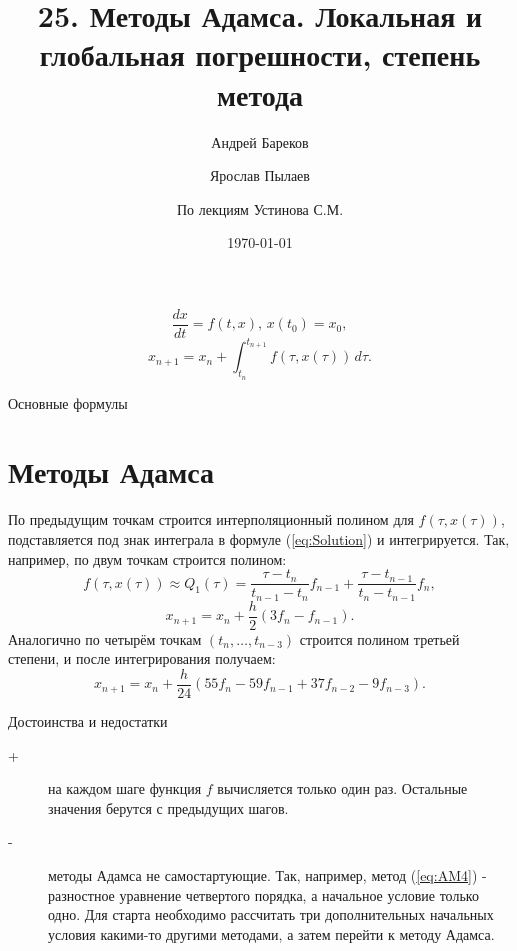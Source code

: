 \documentclass[a4paper,11pt]{article}
\title{25. Методы Адамса. Локальная и глобальная погрешности, степень метода}
\author{Андрей Бареков \and Ярослав Пылаев \and По лекциям Устинова С.М.}
\date{\today}
\begin{document}
\maketitle
\newpage

\begin{importantblock}
  \begin{equation}
    \frac{dx}{dt} = f(t, x),\, x(t_0) = x_0,
    \label{eq:LDLE}
  \end{equation}
  \begin{equation}
    x_{n+1} = x_n + \int_{t_n}^{t_{n+1}} f(\tau, x(\tau))\,d\tau.
    \label{eq:Solution}
  \end{equation}
  \begin{center}
    \small{Основные формулы}
  \end{center}
\end{importantblock}

\section{Методы Адамса}
По предыдущим точкам строится интерполяционный полином для $f(\tau, x(\tau))$, подставляется
  под знак интеграла в формуле (\ref{eq:Solution}) и интегрируется. Так, например, по двум точкам строится полином:
\[f(\tau,x(\tau)) \approx Q_1(\tau) = \frac{\tau - t_n}{t_{n-1} - t_n}f_{n-1} + \frac{\tau - t_{n-1}}{t_n - t_{n-1}}f_n,\]
\begin{equation}
  x_{n+1} = x_n + \frac{h}{2}(3f_n - f_{n-1}).
  \label{eq:AM2}
\end{equation}
Аналогично по четырём точкам $(t_n, \dots, t_{n-3})$ строится полином третьей степени, и после интегрирования получаем:
\begin{equation}
  x_{n+1} = x_n + \frac{h}{24}(55f_n - 59f_{n-1} + 37f_{n-2} - 9f_{n-3}).
  \label{eq:AM4}
\end{equation}
\begin{importantblock}
  \begin{center}
    Достоинства и недостатки
  \end{center}
  \begin{description}
    \item [+] на каждом шаге функция $f$ вычисляется только один раз. Остальные значения берутся с предыдущих шагов.
    \item [-] методы Адамса не самостартующие. Так, например, метод (\ref{eq:AM4}) - разностное уравнение четвертого порядка, а начальное условие только одно.
              Для старта необходимо рассчитать три дополнительных начальных условия какими-то другими методами, а затем перейти к методу Адамса.
  \end{description}
\end{importantblock}
\end{document}
